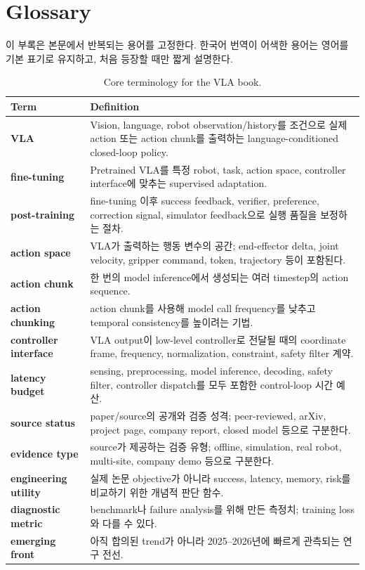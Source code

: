\chapter{Glossary}
\label{app:glossary}

이 부록은 본문에서 반복되는 용어를 고정한다. 한국어 번역이 어색한 용어는 영어를 기본 표기로 유지하고, 처음 등장할 때만 짧게 설명한다.

\begin{table}[h]
  \centering
  \caption{Core terminology for the VLA book.}
  \label{tab:glossary}
  \begin{tabularx}{\textwidth}{>{\bfseries}p{38mm}X}
    \toprule
    Term & Definition \\
    \midrule
    VLA & Vision, language, robot observation/history를 조건으로 실제 action 또는 action chunk를 출력하는 language-conditioned closed-loop policy. \\
    fine-tuning & Pretrained VLA를 특정 robot, task, action space, controller interface에 맞추는 supervised adaptation. \\
    post-training & fine-tuning 이후 success feedback, verifier, preference, correction signal, simulator feedback으로 실행 품질을 보정하는 절차. \\
    action space & VLA가 출력하는 행동 변수의 공간; end-effector delta, joint velocity, gripper command, token, trajectory 등이 포함된다. \\
    action chunk & 한 번의 model inference에서 생성되는 여러 timestep의 action sequence. \\
    action chunking & action chunk를 사용해 model call frequency를 낮추고 temporal consistency를 높이려는 기법. \\
    controller interface & VLA output이 low-level controller로 전달될 때의 coordinate frame, frequency, normalization, constraint, safety filter 계약. \\
    latency budget & sensing, preprocessing, model inference, decoding, safety filter, controller dispatch를 모두 포함한 control-loop 시간 예산. \\
    source status & paper/source의 공개와 검증 성격; peer-reviewed, arXiv, project page, company report, closed model 등으로 구분한다. \\
    evidence type & source가 제공하는 검증 유형; offline, simulation, real robot, multi-site, company demo 등으로 구분한다. \\
    engineering utility & 실제 논문 objective가 아니라 success, latency, memory, risk를 비교하기 위한 개념적 판단 함수. \\
    diagnostic metric & benchmark나 failure analysis를 위해 만든 측정치; training loss와 다를 수 있다. \\
    emerging front & 아직 합의된 trend가 아니라 2025--2026년에 빠르게 관측되는 연구 전선. \\
    \bottomrule
  \end{tabularx}
\end{table}
